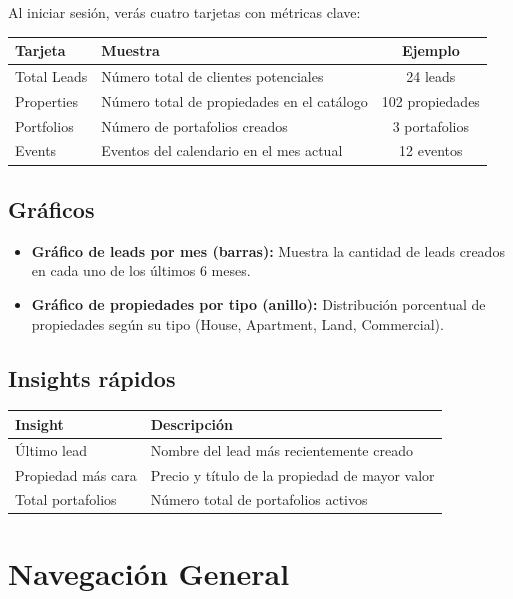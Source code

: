 \documentclass[12pt,oneside]{article}
\begin{document}
Al iniciar sesión, verás cuatro tarjetas con métricas clave:

\begin{tabularx}{\textwidth}{|X|X|c|}
\hline
\rowcolor{primary!10}
\textbf{Tarjeta} & \textbf{Muestra} & \textbf{Ejemplo} \\
\hline
Total Leads & Número total de clientes potenciales & 24 leads \\
\hline
Properties & Número total de propiedades en el catálogo & 102 propiedades \\
\hline
Portfolios & Número de portafolios creados & 3 portafolios \\
\hline
Events & Eventos del calendario en el mes actual & 12 eventos \\
\hline
\end{tabularx}

\subsection{Gráficos}

\begin{itemize}[leftmargin=*]
  \item \textbf{Gráfico de leads por mes (barras):} Muestra la cantidad de leads creados en cada uno de los últimos 6 meses.
  \item \textbf{Gráfico de propiedades por tipo (anillo):} Distribución porcentual de propiedades según su tipo (House, Apartment, Land, Commercial).
\end{itemize}

\subsection{Insights rápidos}

\begin{tabularx}{\textwidth}{|X|X|}
\hline
\rowcolor{primary!10}
\textbf{Insight} & \textbf{Descripción} \\
\hline
Último lead & Nombre del lead más recientemente creado \\
\hline
Propiedad más cara & Precio y título de la propiedad de mayor valor \\
\hline
Total portafolios & Número total de portafolios activos \\
\hline
\end{tabularx}

\section{Navegación General}
\end{document}
